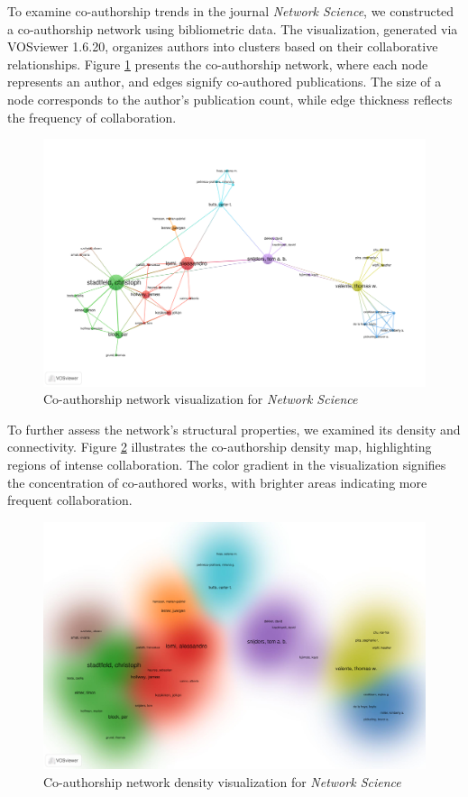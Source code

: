\documentclass[twocolumn]{article}
\begin{document}
		To examine co-authorship trends in the journal \textit{Network Science}, we constructed a co-authorship network using bibliometric data. The visualization, generated via VOSviewer 1.6.20, organizes authors into clusters based on their collaborative relationships. Figure \ref{fig.fig15} presents the co-authorship network, where each node represents an author, and edges signify co-authored publications. The size of a node corresponds to the author’s publication count, while edge thickness reflects the frequency of collaboration.
		
		\begin{figure}[htbp]
			\centering
			\includegraphics[width=\columnwidth]{Network Science/VOS/co-authorship.pdf}
			\caption{Co-authorship network visualization for \textit{Network Science}}
			\label{fig.fig15}
		\end{figure}
		
		To further assess the network’s structural properties, we examined its density and connectivity. Figure \ref{fig.fig16} illustrates the co-authorship density map, highlighting regions of intense collaboration. The color gradient in the visualization signifies the concentration of co-authored works, with brighter areas indicating more frequent collaboration.
		
		\begin{figure}[htbp]
			\centering
			\includegraphics[width=\columnwidth]{Network Science/VOS/co-authorship-density.pdf}
			\caption{Co-authorship network density visualization for \textit{Network Science}}
			\label{fig.fig16}
		\end{figure}
		
\end{document}
